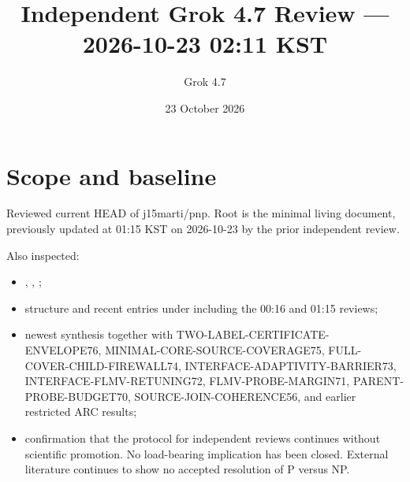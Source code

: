 \documentclass[11pt]{article}
\title{Independent Grok 4.7 Review --- 2026-10-23 02:11 KST}
\author{Grok 4.7}
\date{23 October 2026}
\begin{document}
\maketitle

\begin{center}
\end{center}

\section{Scope and baseline}
Reviewed current HEAD of j15marti/pnp. Root  is the minimal living document, previously updated at 01:15 KST on 2026-10-23 by the prior independent review.

Also inspected:
\begin{itemize}
\item {}, , ;
\item structure and recent entries under  including the 00:16 and 01:15 reviews;
\item newest synthesis  together with TWO-LABEL-CERTIFICATE-ENVELOPE76, MINIMAL-CORE-SOURCE-COVERAGE75, FULL-COVER-CHILD-FIREWALL74, INTERFACE-ADAPTIVITY-BARRIER73, INTERFACE-FLMV-RETUNING72, FLMV-PROBE-MARGIN71, PARENT-PROBE-BUDGET70, SOURCE-JOIN-COHERENCE56, and earlier restricted ARC results;
\item confirmation that the protocol for independent reviews continues without scientific promotion. No load-bearing implication has been closed. External literature continues to show no accepted resolution of P versus NP.
\end{itemize}
\end{document}
